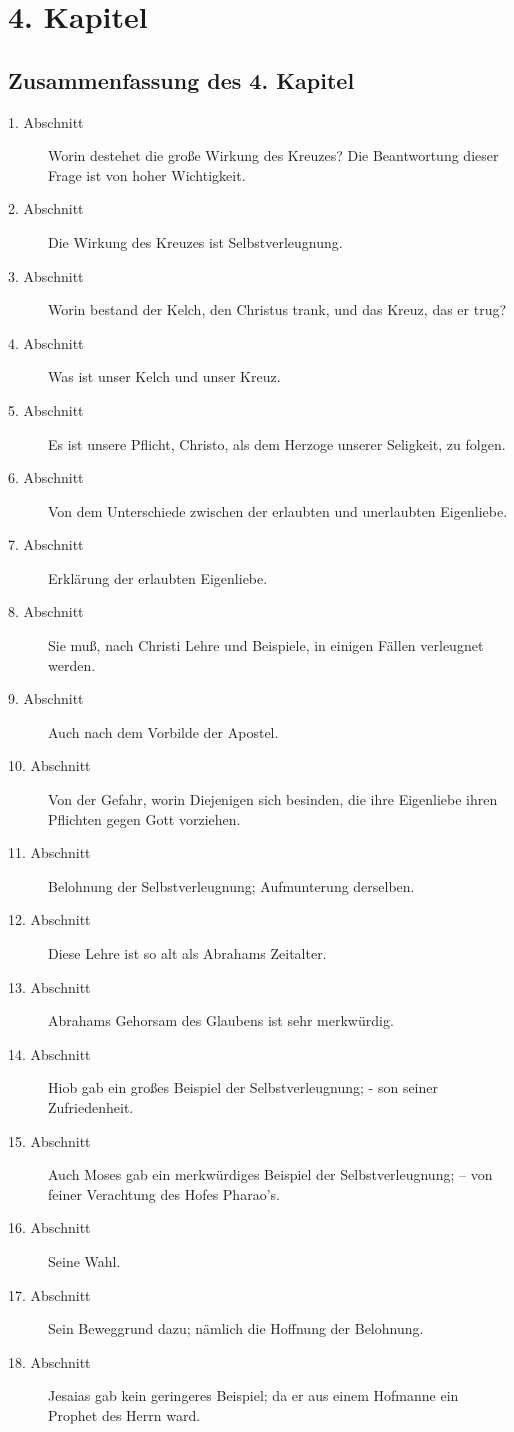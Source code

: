 
\chapter{4. Kapitel}
\section{Zusammenfassung des 4. Kapitel}
\small
\begin{description}
\item[1. Abschnitt] Worin destehet die große Wirkung des Kreuzes? Die Beantwortung dieser Frage ist von hoher Wichtigkeit.
\item[2. Abschnitt] Die Wirkung des Kreuzes ist Selbstverleugnung.
\item[3. Abschnitt] Worin bestand der Kelch, den Christus trank, und das Kreuz, das er trug?
\item[4. Abschnitt]  Was ist unser Kelch und unser Kreuz.
\item[5. Abschnitt] Es ist unsere Pflicht, Christo, als dem Herzoge unserer Seligkeit, zu folgen.
\item[6. Abschnitt] Von dem Unterschiede zwischen der erlaubten und unerlaubten Eigenliebe.
\item[7. Abschnitt] Erklärung der erlaubten Eigenliebe.
\item[8. Abschnitt] Sie muß, nach Christi Lehre und Beispiele, in einigen Fällen verleugnet werden.
\item[9. Abschnitt] Auch nach dem Vorbilde der Apostel.
\item[10. Abschnitt] Von der Gefahr, worin Diejenigen sich besinden, die ihre Eigenliebe ihren Pflichten gegen Gott vorziehen.
\item[11. Abschnitt] Belohnung der Selbstverleugnung; Aufmunterung derselben.
\item[12. Abschnitt] Diese Lehre ist so alt als Abrahams Zeitalter.
\item[13. Abschnitt] Abrahams Gehorsam des Glaubens ist sehr merkwürdig.
\item[14. Abschnitt] Hiob gab ein großes Beispiel der Selbstverleugnung; - son seiner Zufriedenheit.
\item[15. Abschnitt] Auch Moses gab ein merkwürdiges Beispiel der Selbstverleugnung; -- von feiner Verachtung des Hofes Pharao's.
\item[16. Abschnitt] Seine Wahl.
\item[17. Abschnitt] Sein Beweggrund dazu; nämlich die Hoffnung der Belohnung.
\item[18. Abschnitt] Jesaias gab kein geringeres Beispiel; da er aus einem Hofmanne ein Prophet des Herrn ward.

\end{description}
